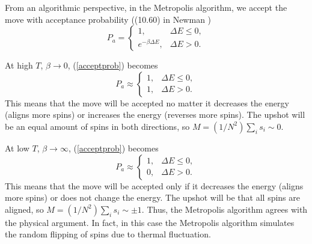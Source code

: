 \documentclass[11pt]{article}
\begin{document}
From an algorithmic perspective, in the Metropolis algorithm, we accept the move with acceptance probability ((10.60) in Newman \cite{newman2013computational})
\begin{equation}\label{acceptprob}
    P_a = \begin{cases}
        1, & \Delta E \leq 0, \\
        e^{-\beta \Delta E}, & \Delta E > 0.
    \end{cases}
\end{equation}

At high $T$, $\beta \rightarrow 0$, (\ref{acceptprob}) becomes
\begin{equation}
    P_a \approx \begin{cases}
        1, & \Delta E \leq 0, \\
        1, & \Delta E > 0.
    \end{cases}
\end{equation}
This means that the move will be accepted no matter it decreases the energy (aligns more spins) or increases the energy (reverses more spins). The upshot will be an equal amount of spins in both directions, so $M = (1/N^2) \sum_i s_i \sim 0$.

At low $T$, $\beta \rightarrow \infty$, (\ref{acceptprob}) becomes
\begin{equation}
    P_a \approx \begin{cases}
        1, & \Delta E \leq 0, \\
        0, & \Delta E > 0.
    \end{cases}
\end{equation}
This means that the move will be accepted only if it decreases the energy (aligns more spins) or does not change the energy. The upshot will be that all spins are aligned, so $M = (1/N^2) \sum_i s_i \sim \pm 1$. Thus, the Metropolis algorithm agrees with the physical argument. In fact, in this case the Metropolis algorithm simulates the random flipping of spins due to thermal fluctuation.
\end{document}
